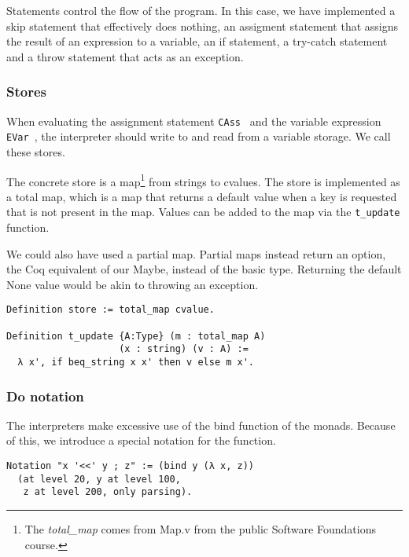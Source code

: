 Statements control the flow of the program. In this case, we have implemented a
skip statement that effectively does nothing, an assigment statement that
assigns the result of an expression to a variable, an if statement, a try-catch
statement and a throw statement that acts as an exception.

\subsubsection{Stores}\label{sec:stores}
When evaluating the assignment statement \texttt{CAss } and the variable
expression \texttt{EVar }, the interpreter should write to and read from a variable
storage. We call these stores. 

The concrete store is a map\footnote{The \textit{total\_map} comes from 
	Map.v from the public Software Foundations course.\cite{softwarefoundations}} 
from strings to cvalues. The store is implemented as a total map, which is a
map that returns a default value when a key is requested that is not present in
the map. Values can be added to the map via the \texttt{t_update }
function.

We could also have used a partial map. Partial maps instead return an option,
the Coq equivalent of our Maybe, instead of the basic type.
Returning the default None value would be akin to throwing an exception.

\begin{listing}
\begin{verbatim}
Definition store := total_map cvalue.

Definition t_update {A:Type} (m : total_map A)
                    (x : string) (v : A) :=
  λ x', if beq_string x x' then v else m x'.

\end{verbatim}
\end{listing}

\subsubsection{Do notation}
The interpreters make excessive use of the bind function of the monads.
Because of this, we introduce a special notation for the function.

\begin{listing}
\begin{verbatim}
Notation "x '<<' y ; z" := (bind y (λ x, z))
  (at level 20, y at level 100, 
   z at level 200, only parsing).
\end{verbatim}
\end{listing}

